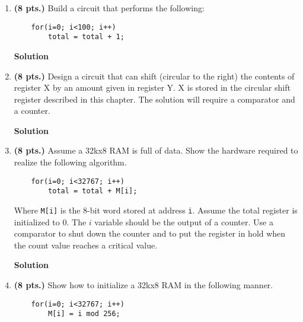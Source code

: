\begin{enumerate}
\begin{onlysolution}
{\begin{figure}[ht]
\end{figure}
} \end{onlysolution} 


\item\textbf{ (8 pts.)} Build a circuit that performs the following: 
\begin{verbatim}
    for(i=0; i<100; i++) 
        total = total + 1;
\end{verbatim}

\begin{onlysolution}  \textbf{Solution} \itshape{
\begin{figure}[ht]
\end{figure}
} \end{onlysolution} 


\item\textbf{ (8 pts.)} Design a circuit that can shift (circular 
to the right) the contents of register X by an amount given in 
register Y. X is stored in the circular shift register described 
in this chapter. The solution will require a comparator and a
counter.
\begin{onlysolution}  \textbf{Solution} \itshape{
\begin{figure}[ht]
\end{figure}
} \end{onlysolution} 


\item\textbf{ (8 pts.)} Assume a 32kx8 RAM is full of data. Show 
the hardware required to realize the following algorithm. 
\begin{verbatim}
    for(i=0; i<32767; i++)
        total = total + M[i];
\end{verbatim}

Where \verb+M[i]+ is the 8-bit word stored at address \verb^i^. 
Assume the total register is initialized to 0. The $i$ variable should 
be the output of a counter. Use a comparator to shut down the counter 
and to put the register in hold when the count value reaches a critical 
value.  
\begin{onlysolution}  \textbf{Solution} \itshape{
\begin{figure}[ht]
\end{figure}
} \end{onlysolution} 


\item\textbf{ (8 pts.)} Show how to initialize a 32kx8 RAM in the following manner. 
\begin{verbatim}
    for(i=0; i<32767; i++) 
        M[i] = i mod 256;
\end{verbatim}


\end{enumerate}
